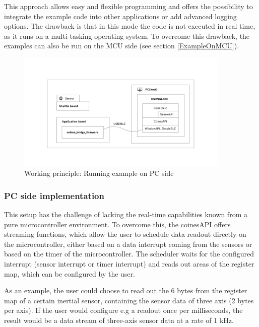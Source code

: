 \documentclass[11pt,headings=small]{scrartcl}
\begin{document}
This approach allows easy and flexible programming and offers the possibility to integrate the example code into other applications or add advanced logging options. The drawback is that in this mode the code is not executed in real time, as it runs on a multi-tasking operating system. To overcome this drawback, the examples can also be run on the MCU side (see section \ref{ExampleOnMCU}).

\begin{figure}[H]
	\begin{center}
		\includegraphics[width=0.9\textwidth]{coinesAPI_images/COINES_workingPrinciple_runOnPC.png}
		\caption{Working principle: Running example on PC side}
	\end{center}
\end{figure}

\subsubsection{PC side implementation}
This setup has the challenge of lacking the real-time capabilities known from a pure microcontroller environment. To overcome this, the coinesAPI offers streaming functions, which allow the user to schedule data readout directly on the microcontroller, either based on a data interrupt coming from the sensors or based on the timer of the microcontroller. The scheduler waits for the configured interrupt (sensor interrupt or timer interrupt) and reads out areas of the register map, which can be configured by the user.

As an example, the user could choose to read out the 6 bytes from the register map of a certain inertial sensor, containing the sensor data of three axis (2 bytes per axis). If the user would configure e.g a readout once per milliseconds, the result would be a data stream of three-axis sensor data at a rate of 1 kHz.
\end{document}
